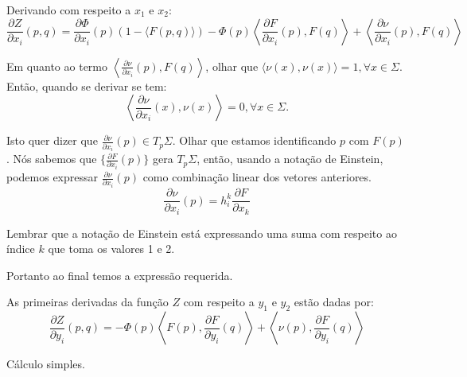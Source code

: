 \begin{demonstracao}
	Derivando com respeito a $x_1$ e $x_2$:
	\begin{equation*}
		\frac{\partial Z}{\partial x_i} (p, q) =  \frac{\partial \Phi}{\partial x_i}(p) (1 - \langle F(p, q) \rangle) -  \Phi(p) \left\langle \frac{\partial F}{\partial x_i}(p), F(q) \right\rangle + \left\langle \frac{\partial \nu}{\partial x_i}(p), F(q) \right\rangle
	\end{equation*}
	
	Em quanto ao termo $ \left\langle \frac{\partial \nu}{\partial x_i}(p), F(q) \right\rangle $, olhar que $\langle \nu(x), \nu(x) \rangle=1, \forall x \in \Sigma$. Então, quando se derivar se tem:
	\begin{equation*}
		\left\langle \frac{\partial \nu}{\partial x_i}(x), \nu(x) \right\rangle = 0, \forall x \in \Sigma.
	\end{equation*}
	
	Isto quer dizer que $\frac{\partial \nu}{\partial x_i}(p) \in T_{p} \Sigma$. Olhar que estamos identificando $p$ com $F(p)$. Nós sabemos que $\{ \frac{\partial F}{\partial x_i}(p) \}$ gera $T_{p} \Sigma$, então, usando a notação de Einstein, podemos expressar $\frac{\partial \nu}{\partial x_i}(p)$ como combinação linear dos vetores anteriores.
	\begin{equation}\label{der_nu_x}
		\frac{\partial \nu}{\partial x_i} (p) = h_i^k \frac{\partial F}{\partial x_k}
	\end{equation}
	
	Lembrar que a notação de Einstein está expressando uma suma com respeito ao índice $k$ que toma os valores 1 e 2.
	
	Portanto ao final temos a expressão requerida.
\end{demonstracao}

\begin{proposicao}
	As primeiras derivadas da função $Z$ com respeito a $y_1$ e $y_2$ estão dadas por:
	\begin{equation}\label{diff_Z_y}
		\frac{\partial Z}{\partial y_i} (p, q) = - \Phi(p) \left\langle F(p), \frac{\partial F}{\partial y_i} (q) \right\rangle + \left\langle \nu(p), \frac{\partial F}{\partial y_i}(q) \right\rangle
	\end{equation}
\end{proposicao}

\begin{demonstracao}
	Cálculo simples.
\end{demonstracao}



